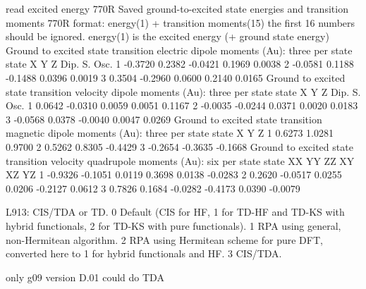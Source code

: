 \documentclass{article}
\begin{document}
        read excited energy
        770R Saved ground-to-excited state energies and transition moments
        770R format:
        energy(1) + transition moments(15)
        the first 16 numbers should be ignored.
        energy(1) is the excited energy (+ ground state energy) 
 Ground to excited state transition electric dipole moments (Au): three per state
       state          X           Y           Z        Dip. S.      Osc.
         1        -0.3720      0.2382     -0.0421      0.1969      0.0038
         2        -0.0581      0.1188     -0.1488      0.0396      0.0019
         3         0.3504     -0.2960      0.0600      0.2140      0.0165
 Ground to excited state transition velocity dipole moments (Au): three per state
       state          X           Y           Z        Dip. S.      Osc.
         1         0.0642     -0.0310      0.0059      0.0051      0.1167
         2        -0.0035     -0.0244      0.0371      0.0020      0.0183
         3        -0.0568      0.0378     -0.0040      0.0047      0.0269
 Ground to excited state transition magnetic dipole moments (Au): three per state
       state          X           Y           Z
         1         0.6273      1.0281      0.9700
         2         0.5262      0.8305     -0.4429
         3        -0.2654     -0.3635     -0.1668
 Ground to excited state transition velocity quadrupole moments (Au): six per state
       state          XX          YY          ZZ          XY          XZ          YZ
         1        -0.9326     -0.1051      0.0119      0.3698      0.0138     -0.0283
         2         0.2620     -0.0517      0.0255      0.0206     -0.2127      0.0612
         3         0.7826      0.1684     -0.0282     -0.4173      0.0390     -0.0079



L913: CIS/TDA or TD.
0 Default (CIS for HF, 1 for TD-HF and TD-KS with hybrid functionals, 2 for TD-KS with pure 
functionals).
1 RPA using general, non-Hermitean algorithm.
2 RPA using Hermitean scheme for pure DFT, converted here to 1 for hybrid functionals and HF.
3 CIS/TDA.

only g09 version D.01 could do TDA
\end{document}
